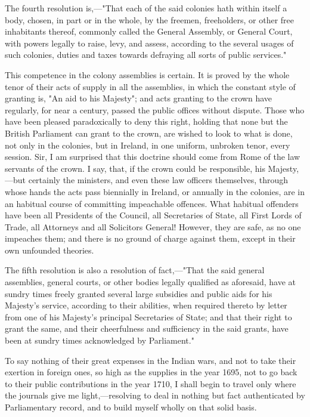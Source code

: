 The fourth resolution is,—"That each of the said colonies hath within itself a body, chosen, in part or in the whole, by the freemen, freeholders, or other free inhabitants thereof, commonly called the General Assembly, or General Court, with powers legally to raise, levy, and assess, according to the several usages of such colonies, duties and taxes towards defraying all sorts of public services."

This competence in the colony assemblies is certain. It is proved by the whole tenor of their acts of supply in all the assemblies, in which the constant style of granting is, "An aid to his Majesty"; and acts granting to the crown have regularly, for near a century, passed the public offices without dispute. Those who have been pleased paradoxically to deny this right, holding that none but the British Parliament can grant to the crown, are wished to look to what is done, not only in the colonies, but in Ireland, in one uniform, unbroken tenor, every session. Sir, I am surprised that this doctrine should come from Rome of the law servants of the crown. I say, that, if the crown could be responsible, his Majesty,—but certainly the ministers, and even these law officers themselves, through whose hands the acts pass biennially in Ireland, or annually in the colonies, are in an habitual course of committing impeachable offences. What habitual offenders have been all Presidents of the Council, all Secretaries of State, all First Lords of Trade, all Attorneys and all Solicitors General! However, they are safe, as no one impeaches them; and there is no ground of charge against them, except in their own unfounded theories.

The fifth resolution is also a resolution of fact,—"That the said general assemblies, general courts, or other bodies legally qualified as aforesaid, have at sundry times freely granted several large subsidies and public aids for his Majesty's service, according to their abilities, when required thereto by letter from one of his Majesty's principal Secretaries of State; and that their right to grant the same, and their cheerfulness and sufficiency in the said grants, have been at sundry times acknowledged by Parliament."

To say nothing of their great expenses in the Indian wars, and not to take their exertion in foreign ones, so high as the supplies in the year 1695, not to go back to their public contributions in the year 1710, I shall begin to travel only where the journals give me light,—resolving to deal in nothing but fact authenticated by Parliamentary record, and to build myself wholly on that solid basis.

